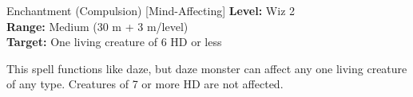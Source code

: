 {Enchantment (Compulsion) [Mind-Affecting]}
{
	\textbf{Level:}
	Wiz 2\\
	\textbf{Range:}
	Medium (30 m + 3 m/level)\\
	\textbf{Target:}
	One living creature of 6 HD or less\\
}
{
	This spell functions like daze, but daze monster can affect any one living creature of any type. Creatures of 7 or more HD are not affected.

}
